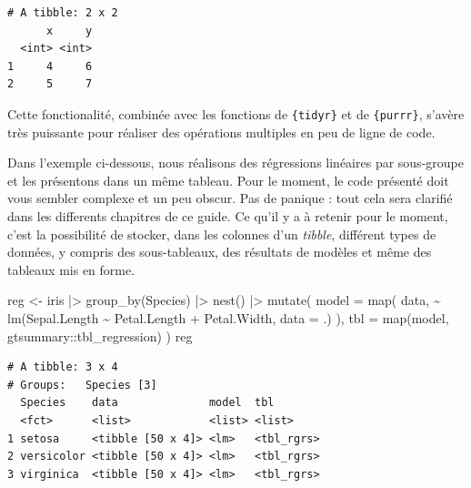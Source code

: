 \documentclass[
  letterpaper,
  DIV=11,
  numbers=noendperiod,
  oneside]{scrreprt}
\newenvironment{Shaded}{\begin{snugshade}}{\end{snugshade}}
\newcommand{\AttributeTok}[1]{\textcolor[rgb]{0.40,0.45,0.13}{#1}}
\newcommand{\DecValTok}[1]{\textcolor[rgb]{0.68,0.00,0.00}{#1}}
\newcommand{\FunctionTok}[1]{\textcolor[rgb]{0.28,0.35,0.67}{#1}}
\newcommand{\NormalTok}[1]{\textcolor[rgb]{0.00,0.23,0.31}{#1}}
\newcommand{\OtherTok}[1]{\textcolor[rgb]{0.00,0.23,0.31}{#1}}
\newcommand{\SpecialCharTok}[1]{\textcolor[rgb]{0.37,0.37,0.37}{#1}}
\begin{document}
\begin{Shaded}
\end{Shaded}

\begin{verbatim}
# A tibble: 2 x 2
      x     y
  <int> <int>
1     4     6
2     5     7
\end{verbatim}

Cette fonctionalité, combinée avec les fonctions de \texttt{\{tidyr\}}
et de \texttt{\{purrr\}}, s'avère très puissante pour réaliser des
opérations multiples en peu de ligne de code.

Dans l'exemple ci-dessous, nous réalisons des régressions linéaires par
sous-groupe et les présentons dans un même tableau. Pour le moment, le
code présenté doit vous sembler complexe et un peu obscur. Pas de
panique : tout cela sera clarifié dans les differents chapitres de ce
guide. Ce qu'il y a à retenir pour le moment, c'est la possibilité de
stocker, dans les colonnes d'un \emph{tibble}, différent types de
données, y compris des sous-tableaux, des résultats de modèles et même
des tableaux mis en forme.

\begin{Shaded}
\begin{Highlighting}[]
\NormalTok{reg }\OtherTok{\textless{}{-}}
\NormalTok{  iris }\SpecialCharTok{|\textgreater{}} 
  \FunctionTok{group\_by}\NormalTok{(Species) }\SpecialCharTok{|\textgreater{}} 
  \FunctionTok{nest}\NormalTok{() }\SpecialCharTok{|\textgreater{}} 
  \FunctionTok{mutate}\NormalTok{(}
    \AttributeTok{model =} \FunctionTok{map}\NormalTok{(}
\NormalTok{      data, }
      \SpecialCharTok{\textasciitilde{}} \FunctionTok{lm}\NormalTok{(Sepal.Length }\SpecialCharTok{\textasciitilde{}}\NormalTok{ Petal.Length }\SpecialCharTok{+}\NormalTok{ Petal.Width, }\AttributeTok{data =}\NormalTok{ .)}
\NormalTok{    ),}
    \AttributeTok{tbl =} \FunctionTok{map}\NormalTok{(model, gtsummary}\SpecialCharTok{::}\NormalTok{tbl\_regression)}
\NormalTok{  )}
\NormalTok{reg}
\end{Highlighting}
\end{Shaded}

\begin{verbatim}
# A tibble: 3 x 4
# Groups:   Species [3]
  Species    data              model  tbl       
  <fct>      <list>            <list> <list>    
1 setosa     <tibble [50 x 4]> <lm>   <tbl_rgrs>
2 versicolor <tibble [50 x 4]> <lm>   <tbl_rgrs>
3 virginica  <tibble [50 x 4]> <lm>   <tbl_rgrs>
\end{verbatim}
\end{document}
